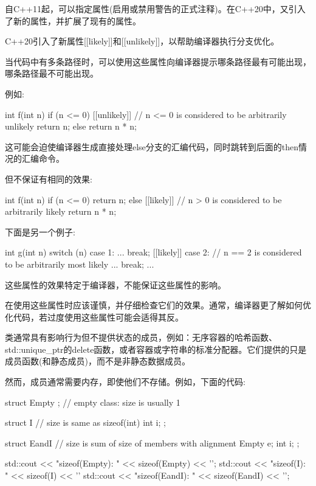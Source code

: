 
自C++11起，可以指定属性(启用或禁用警告的正式注释)。在C++20中，又引入了新的属性，并扩展了现有的属性。

\mySubsubsection{21.6.1}{属性[[likely]]和[unlikely]]}

C++20引入了新属性[[likely]]和[[unlikely]]，以帮助编译器执行分支优化。

当代码中有多条路径时，可以使用这些属性向编译器提示哪条路径最有可能出现，哪条路径最不可能出现。

例如:

\begin{cpp}
int f(int n)
{
	if (n <= 0) [[unlikely]] { // n <= 0 is considered to be arbitrarily unlikely
		return n;
	}
	else {
		return n * n;
	}
}
\end{cpp}

这可能会迫使编译器生成直接处理else分支的汇编代码，同时跳转到后面的then情况的汇编命令。

但不保证有相同的效果:

\begin{cpp}
int f(int n)
{
	if (n <= 0) {
		return n;
	}
	else [[likely]] { // n > 0 is considered to be arbitrarily likely
		return n * n;
	}
}
\end{cpp}

下面是另一个例子:

\begin{cpp}
int g(int n)
{
	switch (n) {
		case 1:
		...
		break;
		[[likely]] case 2: // n == 2 is considered to be arbitrarily most likely
		...
		break;
	}
	...
}
\end{cpp}

这些属性的效果特定于编译器，不能保证这些属性的影响。

在使用这些属性时应该谨慎，并仔细检查它们的效果。通常，编译器更了解如何优化代码，若过度使用这些属性可能会适得其反。


类通常具有影响行为但不提供状态的成员，例如：无序容器的哈希函数、std::unique\_ptr的delete函数，或者容器或字符串的标准分配器。它们提供的只是成员函数(和静态成员)，而不是非静态数据成员。

然而，成员通常需要内存，即使他们不存储。例如，下面的代码:

\begin{cpp}
struct Empty {}; // empty class: size is usually 1

struct I { // size is same as sizeof(int)
	int i;
};

struct EandI { // size is sum of size of members with alignment
	Empty e;
	int i;
};

std::cout << "sizeof(Empty): " << sizeof(Empty) << '\n';
std::cout << "sizeof(I): " << sizeof(I) << '\n'
std::cout << "sizeof(EandI): " << sizeof(EandI) << '\n';
\end{cpp}

